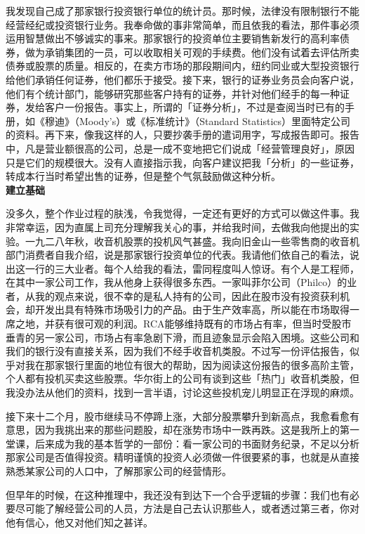 \documentclass[UTF8,a4paper,zihao=-4,fontset = windows]{ctexart} %
\begin{document}
我发现自己成了那家银行投资银行单位的统计员。那时候，法律没有限制银行不能经营经纪或投资银行业务。我奉命做的事非常简单，而且依我的看法，那件事必须运用智慧做出不够诚实的事来。那家银行的投资单位主要销售新发行的高利率债券，做为承销集团的一员，可以收取相关可观的手续费。他们没有试着去评估所卖债券或股票的质量。相反的，在卖方市场的那段期间内，纽约同业或大型投资银行给他们承销任何证券，他们都乐于接受。接下来，银行的证券业务员会向客户说，他们有个统计部门，能够研究那些客户持有的证券，并针对他们经手的每一种证券，发给客户一份报告。事实上，所谓的「证券分析」，不过是查阅当时已有的手册，如《穆迪》（Moody's）或《标准统计》（Standard Statistics）里面特定公司的资料。再下来，像我这样的人，只要抄袭手册的遣词用字，写成报告即可。报告中，凡是营业额很高的公司，总是一成不变地把它们说成「经营管理良好」，原因只是它们的规模很大。没有人直接指示我，向客户建议把我「分析」的一些证券，转成本行当时希望出售的证券，但是整个气氛鼓励做这种分析。
\\

\textbf{建立基础}


没多久，整个作业过程的肤浅，令我觉得，一定还有更好的方式可以做这件事。我非常幸运，因为直属上司充分理解我关心的事，并给我时间，去做我向他提出的实验。一九二八年秋，收音机股票的投机风气甚盛。我向旧金山一些零售商的收音机部门消费者自我介绍，说是那家银行投资单位的代表。我请他们依自己的看法，说出这一行的三大业者。每个人给我的看法，雷同程度叫人惊讶。有个人是工程师，在其中一家公司工作，我从他身上获得很多东西。一家叫菲尔公司（Philco）的业者，从我的观点来说，很不幸的是私人持有的公司，因此在股市没有投资获利机会，却开发出具有特殊市场吸引力的产品。由于生产效率高，所以能在市场取得一席之地，并获有很可观的利润。RCA能够维持既有的市场占有率，但当时受股市垂青的另一家公司，市场占有率急剧下滑，而且迹象显示会陷入困境。这些公司和我们的银行没有直接关系，因为我们不经手收音机类股。不过写一份评估报告，似乎对我在那家银行里面的地位有很大的帮助，因为阅读这份报告的很多高阶主管，个人都有投机买卖这些股票。华尔街上的公司有谈到这些「热门」收音机类股，但我没办法从他们的资料，找到一言半语，讨论这些投机宠儿明显正在浮现的麻烦。

接下来十二个月，股市继续马不停蹄上涨，大部分股票攀升到新高点，我愈看愈有意思，因为我挑出来的那些问题股，却在涨势市场中一跌再跌。这是我所上的第一堂课，后来成为我的基本哲学的一部份：看一家公司的书面财务纪录，不足以分析那家公司是否值得投资。精明谨慎的投资人必须做一件很要紧的事，也就是从直接熟悉某家公司的人口中，了解那家公司的经营情形。

但早年的时候，在这种推理中，我还没有到达下一个合乎逻辑的步骤：我们也有必要尽可能了解经营公司的人员，方法是自己去认识那些人，或者透过第三者，你对他有信心，他又对他们知之甚详。
\end{document}

